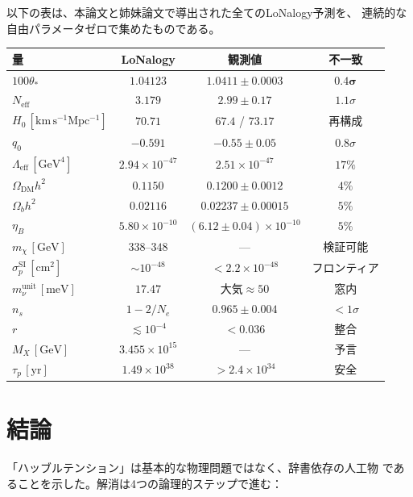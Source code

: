 \documentclass[12pt]{article}
\theoremstyle{plain}
\theoremstyle{definition}
\numberwithin{equation}{section}
\newcommand{\eff}{\mathrm{eff}}
\begin{document}
以下の表は、本論文と姉妹論文で導出された全てのLoNalogy予測を、
連続的な自由パラメータゼロで集めたものである。

\begin{center}
\begin{tabular}{lccc}
\toprule
量 & LoNalogy & 観測値 & 不一致\\
\midrule
$100\theta_*$ & $\mathbf{1.04123}$ & $1.0411\pm0.0003$ & $\mathbf{0.4\sigma}$\\
$N_{\eff}$ & $3.179$ & $2.99\pm0.17$ & $1.1\sigma$\\
$H_0\,[\mathrm{km\,s^{-1}Mpc^{-1}}]$ & $70.71$ & $67.4$ / $73.17$ & 再構成\\
$q_0$ & $-0.591$ & $-0.55\pm0.05$ & $0.8\sigma$\\
\midrule
$\Lambda_{\eff}\,[\mathrm{GeV}^4]$ & $2.94\times10^{-47}$ & $2.51\times10^{-47}$ & $17\%$\\
$\Omega_{\mathrm{DM}}h^2$ & $0.1150$ & $0.1200\pm0.0012$ & $4\%$\\
$\Omega_b h^2$ & $0.02116$ & $0.02237\pm0.00015$ & $5\%$\\
$\eta_B$ & $5.80\times10^{-10}$ & $(6.12\pm0.04)\times10^{-10}$ & $5\%$\\
$m_\chi\,[\mathrm{GeV}]$ & $338$--$348$ & --- & 検証可能\\
$\sigma_p^{\mathrm{SI}}\,[\mathrm{cm}^2]$ & $\sim10^{-48}$ & $<2.2\times10^{-48}$ & フロンティア\\
$m_\nu^{\mathrm{unit}}\,[\mathrm{meV}]$ & $17.47$ & 大気$\approx50$ & 窓内\\
$n_s$ & $1-2/N_e$ & $0.965\pm0.004$ & $<1\sigma$\\
$r$ & $\lesssim10^{-4}$ & $<0.036$ & 整合\\
$M_X\,[\mathrm{GeV}]$ & $3.455\times10^{15}$ & --- & 予言\\
$\tau_p\,[\mathrm{yr}]$ & $1.49\times10^{38}$ & $>2.4\times10^{34}$ & 安全\\
\bottomrule
\end{tabular}
\end{center}


\section*{結論}

「ハッブルテンション」は基本的な物理問題ではなく、辞書依存の人工物
であることを示した。解消は4つの論理的ステップで進む：
\end{document}
